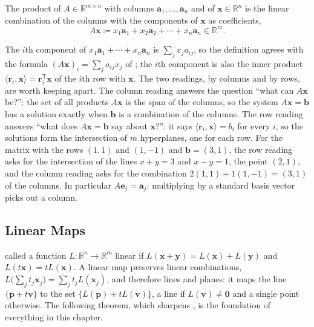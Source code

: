 \begin{definition}
\label{def:matrix-vector}
The product of $A\in\mathbb R^{m\times n}$ with columns $\mathbf a_1,\ldots,\mathbf a_n$ and of $\mathbf x\in\mathbb R^n$ is the linear combination of the columns with the components of $\mathbf x$ as coefficients,
\[
A\mathbf x\coloneqq x_1\mathbf a_1+x_2\mathbf a_2+\cdots+x_n\mathbf a_n\in\mathbb R^m .
\]
\end{definition}

The $i$th component of $x_1\mathbf a_1+\cdots+x_n\mathbf a_n$ is $\sum_jx_ja_{ij}$, so the definition agrees with the formula $(A\mathbf x)_i=\sum_ja_{ij}x_j$ of ; the $i$th component is also the inner product $\langle\mathbf r_i,\mathbf x\rangle=\mathbf r_i^{\mathsf T}\mathbf x$ of the $i$th row with $\mathbf x$. The two readings, by columns and by rows, are worth keeping apart. The column reading answers the question ``what can $A\mathbf x$ be?'': the set of all products $A\mathbf x$ is the span of the columns, so the system $A\mathbf x=\mathbf b$ has a solution exactly when $\mathbf b$ is a combination of the columns. The row reading answers ``what does $A\mathbf x=\mathbf b$ say about $\mathbf x$?'': it says $\langle\mathbf r_i,\mathbf x\rangle=b_i$ for every $i$, so the solutions form the intersection of $m$ hyperplanes, one for each row. For the matrix with the rows $(1,1)$ and $(1,-1)$ and $\mathbf b=(3,1)$, the row reading asks for the intersection of the lines $x+y=3$ and $x-y=1$, the point $(2,1)$, and the column reading asks for the combination $2(1,1)+1(1,-1)=(3,1)$ of the columns. In particular $A\mathbf e_j=\mathbf a_j$: multiplying by a standard basis vector picks out a column.

\subsection{Linear Maps}

 called a function $L\colon\mathbb R^n\to\mathbb R^m$ linear if $L(\mathbf x+\mathbf y)=L(\mathbf x)+L(\mathbf y)$ and $L(t\mathbf x)=tL(\mathbf x)$. A linear map preserves linear combinations, $L\bigl(\sum_jt_j\mathbf x_j\bigr)=\sum_jt_jL(\mathbf x_j)$, and therefore lines and planes: it maps the line $\{\mathbf p+t\mathbf v\}$ to the set $\{L(\mathbf p)+tL(\mathbf v)\}$, a line if $L(\mathbf v)\ne\mathbf 0$ and a single point otherwise. The following theorem, which sharpens , is the foundation of everything in this chapter.

